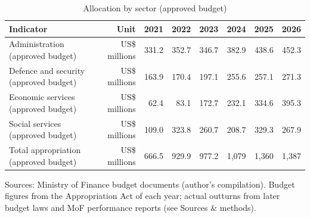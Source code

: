 \begin{table}[htbp]\centering
\caption{Allocation by sector (approved budget)}
\begin{tabular}{lrrrrrrr}
\toprule
Indicator & Unit & 2021 & 2022 & 2023 & 2024 & 2025 & 2026 \\
\midrule
Administration (approved budget) & US\$ millions & 331.2 & 352.7 & 346.7 & 382.9 & 438.6 & 452.3 \\
Defence and security (approved budget) & US\$ millions & 163.9 & 170.4 & 197.1 & 255.6 & 257.1 & 271.3 \\
Economic services (approved budget) & US\$ millions & 62.4 & 83.1 & 172.7 & 232.1 & 334.6 & 395.3 \\
Social services (approved budget) & US\$ millions & 109.0 & 323.8 & 260.7 & 208.7 & 329.3 & 267.9 \\
Total appropriation (approved budget) & US\$ millions & 666.5 & 929.9 & 977.2 & 1,079 & 1,360 & 1,387 \\
\bottomrule
\end{tabular}
\par\smallskip\footnotesize Sources: Ministry of Finance budget documents (author's compilation). Budget figures from the Appropriation Act of each year; actual outturns from later budget laws and MoF performance reports (see Sources \& methods).
\end{table}
